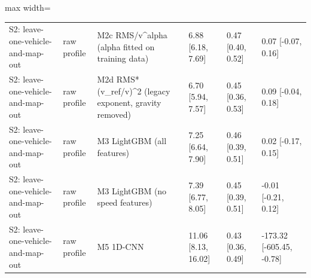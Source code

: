 \begin{table}[!htbp]
\begin{adjustbox}{max width=\columnwidth}
\begin{tabular}{>{\raggedright\arraybackslash}p{3.4cm}l>{\raggedright\arraybackslash}p{4.6cm}lll}
S2: leave-one-vehicle-and-map-out & raw profile & M2c RMS/v\textasciicircum{}alpha (alpha fitted on training data) & 6.88 [6.18, 7.69] & 0.47 [0.40, 0.52] & 0.07 [-0.07, 0.16] \\
S2: leave-one-vehicle-and-map-out & raw profile & M2d RMS*(v\_ref/v)\textasciicircum{}2 (legacy exponent, gravity removed) & 6.70 [5.94, 7.57] & 0.45 [0.36, 0.53] & 0.09 [-0.04, 0.18] \\
S2: leave-one-vehicle-and-map-out & raw profile & M3 LightGBM (all features) & 7.25 [6.64, 7.90] & 0.46 [0.39, 0.51] & 0.02 [-0.17, 0.15] \\
S2: leave-one-vehicle-and-map-out & raw profile & M3 LightGBM (no speed features) & 7.39 [6.77, 8.05] & 0.45 [0.39, 0.51] & -0.01 [-0.21, 0.12] \\
S2: leave-one-vehicle-and-map-out & raw profile & M5 1D-CNN & 11.06 [8.13, 16.02] & 0.43 [0.36, 0.49] & -173.32 [-605.45, -0.78] \\
\bottomrule
\end{tabular}
\end{adjustbox}
\end{table}
